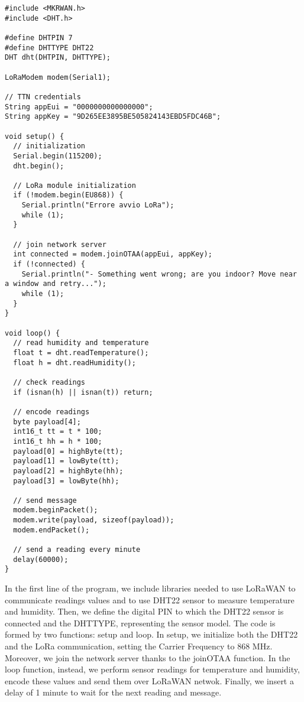 \begin{lstlisting}[language=Arduino, numbers=none]
#include <MKRWAN.h>
#include <DHT.h>

#define DHTPIN 7
#define DHTTYPE DHT22
DHT dht(DHTPIN, DHTTYPE);

LoRaModem modem(Serial1);

// TTN credentials
String appEui = "0000000000000000";  
String appKey = "9D265EE3895BE505824143EBD5FDC46B";

void setup() {
  // initialization
  Serial.begin(115200);
  dht.begin();
  
  // LoRa module initialization
  if (!modem.begin(EU868)) {
    Serial.println("Errore avvio LoRa"); 
    while (1);
  }
  
  // join network server
  int connected = modem.joinOTAA(appEui, appKey);
  if (!connected) {
    Serial.println("- Something went wrong; are you indoor? Move near a window and retry...");
    while (1);
  }
}

void loop() {
  // read humidity and temperature
  float t = dht.readTemperature();
  float h = dht.readHumidity();
  
  // check readings 
  if (isnan(h) || isnan(t)) return;

  // encode readings
  byte payload[4];
  int16_t tt = t * 100;
  int16_t hh = h * 100;
  payload[0] = highByte(tt);
  payload[1] = lowByte(tt);
  payload[2] = highByte(hh);
  payload[3] = lowByte(hh);

  // send message
  modem.beginPacket();
  modem.write(payload, sizeof(payload));
  modem.endPacket();

  // send a reading every minute 
  delay(60000);
}
\end{lstlisting}

In the first line of the program, we include libraries needed to use LoRaWAN to communicate readings values and to use DHT22 sensor to measure temperature and humidity. Then, we define the digital PIN to which the DHT22 sensor is connected and the DHTTYPE, representing the sensor model. The code is formed by two functions: setup and loop. In setup, we initialize both the DHT22 and the LoRa communication, setting the Carrier Frequency to 868 MHz. Moreover, we join the network server thanks to the joinOTAA function. In the loop function, instead, we perform sensor readings for temperature and humidity, encode these values and send them over LoRaWAN netwok. Finally, we insert a delay of 1 minute to wait for the next reading and message.
	 
